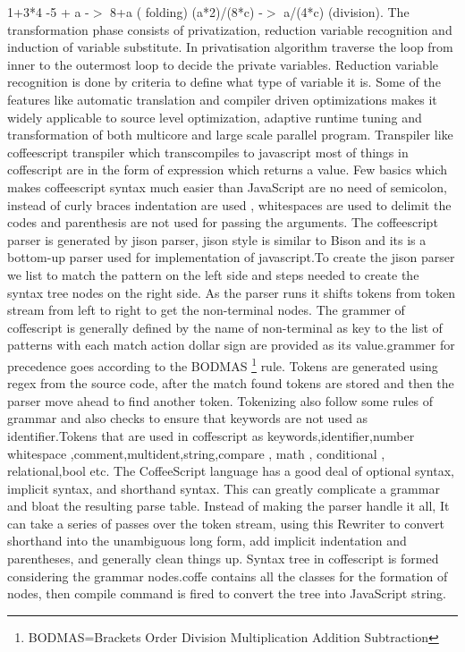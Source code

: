 \documentclass[23pt]{article}
\begin{document}
{1+3*4 -5 + a -$>$ 8+a ( folding) (a*2)/(8*c) -$>$ a/(4*c) (division). The transformation phase consists of privatization, reduction variable recognition and induction of variable substitute. In privatisation algorithm traverse the loop from inner to the outermost loop to decide the private variables. Reduction variable recognition is done by criteria to define what type of variable it is. Some of the features like automatic translation and compiler driven optimizations makes it widely applicable to source level optimization, adaptive runtime tuning and transformation of both multicore and large scale parallel program.
Transpiler like coffeescript transpiler  which transcompiles to javascript most of things in coffescript are in the form of expression which returns a value. Few  basics which makes  coffeescript syntax much easier than JavaScript are no need of semicolon, instead of curly braces indentation are used 
, whitespaces are used to delimit the codes and parenthesis are not used for passing the arguments.
The coffeescript parser is generated by jison  parser,  jison style is similar to Bison and its is a bottom-up parser used for implementation of javascript.To create the jison parser we list to match the pattern on the left side and steps needed to create the syntax tree nodes on the right side. As the parser runs it shifts tokens from token stream from left to right to get the non-terminal nodes.
The grammer of coffescript is generally defined by the name of non-terminal as key to the list of patterns with each match action dollar sign are provided as its value.grammer for precedence goes according to the BODMAS \footnote{BODMAS=Brackets Order Division Multiplication Addition Subtraction} rule. Tokens are generated using regex from the source code, after the match found tokens are stored and then the parser move ahead to find another token. Tokenizing also follow some rules of grammar and also checks to ensure that keywords are not used as identifier.Tokens that are used in coffescript as keywords,identifier,number whitespace ,comment,multident,string,compare , math , conditional , relational,bool etc.
The CoffeeScript language has a good deal of optional syntax, implicit syntax, and shorthand syntax. This can greatly complicate a grammar and bloat the resulting parse table. Instead of making the parser handle it all, It can take a series of passes over the token stream, using this Rewriter to convert shorthand into the unambiguous long form, add implicit indentation and parentheses, and generally clean things up.
Syntax tree in coffescript is formed considering the grammar nodes.coffe contains all the classes for the formation of nodes, then compile command is fired to convert the tree into JavaScript string.
}
\end{document}
